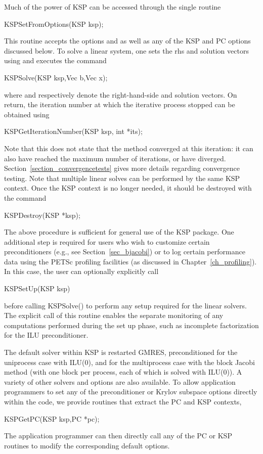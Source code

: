 Much of the power of KSP can be accessed through the single routine
\begin{tabbing}
  KSPSetFromOptions(KSP ksp);
\end{tabbing}
This
routine accepts the options  and  as well as
any of the KSP and PC options discussed below.
To solve a linear system, one sets the rhs and solution vectors using
and executes the
command
\begin{tabbing}
  KSPSolve(KSP ksp,Vec b,Vec x);
\end{tabbing}
where  and  respectively denote the right-hand-side and
solution vectors.  On return, the iteration number at which
the iterative process stopped
%
can be obtained using
\begin{tabbing}
  KSPGetIterationNumber(KSP ksp, int *its);
\end{tabbing}
Note that this does not state that the method converged at this
iteration: it can also have reached the maximum number of iterations,
or have diverged.
%
Section~\ref{section_convergencetests} gives more details regarding
convergence testing. Note that multiple linear solves can be performed by
the same KSP context. Once the KSP context is no longer needed, it should be
destroyed with the command
\begin{tabbing}
  KSPDestroy(KSP *ksp);
\end{tabbing}

The above procedure is sufficient for general use of the KSP package.
One additional step is required for users who wish to customize certain
preconditioners (e.g., see Section~\ref{sec_bjacobi}) or to log certain
performance data using the PETSc profiling facilities (as discussed in
Chapter~\ref{ch_profiling}).
In this case, the user can optionally explicitly call
\begin{tabbing}
  KSPSetUp(KSP ksp)
\end{tabbing}
before calling KSPSolve() to perform any setup required for
the linear solvers.  The explicit call of this routine enables the
separate monitoring of any computations performed during the set up
phase, such as incomplete factorization for the ILU preconditioner.

The default solver within KSP is restarted GMRES, preconditioned for
the uniprocess case with ILU(0), and for the multiprocess case
with the block Jacobi method (with one block per process, each of
which is solved with ILU(0)). A variety of other solvers
and options are also available.
To allow application programmers to set any of the preconditioner or
Krylov subspace options directly within the code, we provide routines
that extract the PC and KSP contexts,
\begin{tabbing}
  KSPGetPC(KSP ksp,PC *pc);\\
\end{tabbing}
The application programmer can then directly call any of the PC or KSP
routines to modify the corresponding default options.

